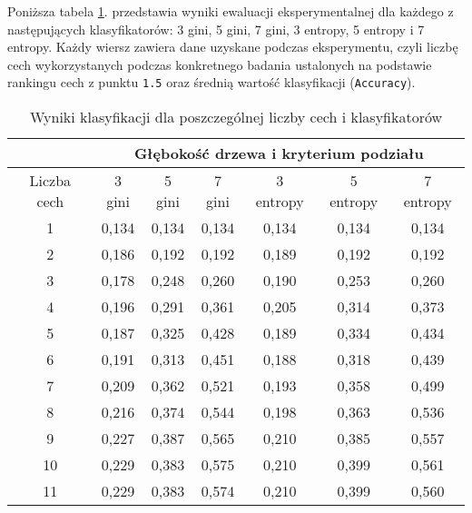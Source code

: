 \documentclass{article}
\begin{document}
Poniższa tabela \ref{tab:zbiorcze_wyniki}. przedstawia wyniki ewaluacji eksperymentalnej dla każdego z następujących klasyfikatorów: 3 gini, 5 gini, 7 gini, 3 entropy, 5 entropy i 7 entropy. Każdy wiersz zawiera dane uzyskane podczas eksperymentu, czyli liczbę cech wykorzystanych podczas konkretnego badania ustalonych na podstawie rankingu cech z punktu \texttt{1.5} oraz średnią wartość klasyfikacji (\texttt{Accuracy}).
\begin{center}
\begin{longtable}{c|c|c|c|c|c|c|}
\caption{Wyniki klasyfikacji dla poszczególnej liczby cech i klasyfikatorów}
		\label{tab:zbiorcze_wyniki}\\
\cline{2-7}
                                  & \multicolumn{6}{c|}{Głębokość drzewa i kryterium podziału}   \\ \hline
\multicolumn{1}{|c|}{Liczba cech} & 3 gini & 5 gini & 7 gini & 3 entropy & 5 entropy & 7 entropy \\ \hline
\multicolumn{1}{|c|}{1}           & 0,134  & 0,134  & 0,134  & 0,134     & 0,134     & 0,134     \\ \hline
\multicolumn{1}{|c|}{2}           & 0,186  & 0,192  & 0,192  & 0,189     & 0,192     & 0,192     \\ \hline
\multicolumn{1}{|c|}{3}           & 0,178  & 0,248  & 0,260  & 0,190     & 0,253     & 0,260     \\ \hline
\multicolumn{1}{|c|}{4}           & 0,196  & 0,291  & 0,361  & 0,205     & 0,314     & 0,373     \\ \hline
\multicolumn{1}{|c|}{5}           & 0,187  & 0,325  & 0,428  & 0,189     & 0,334     & 0,434     \\ \hline
\multicolumn{1}{|c|}{6}           & 0,191  & 0,313  & 0,451  & 0,188     & 0,318     & 0,439     \\ \hline
\multicolumn{1}{|c|}{7}           & 0,209  & 0,362  & 0,521  & 0,193     & 0,358     & 0,499     \\ \hline
\multicolumn{1}{|c|}{8}           & 0,216  & 0,374  & 0,544  & 0,198     & 0,363     & 0,536     \\ \hline
\multicolumn{1}{|c|}{9}           & 0,227  & 0,387  & 0,565  & 0,210     & 0,385     & 0,557     \\ \hline
\multicolumn{1}{|c|}{10}          & 0,229  & 0,383  & 0,575  & 0,210     & 0,399     & 0,561     \\ \hline
\multicolumn{1}{|c|}{11}          & 0,229  & 0,383  & 0,574  & 0,210     & 0,399     & 0,560     \\ \hline

\end{longtable}
\end{center}
\end{document}
